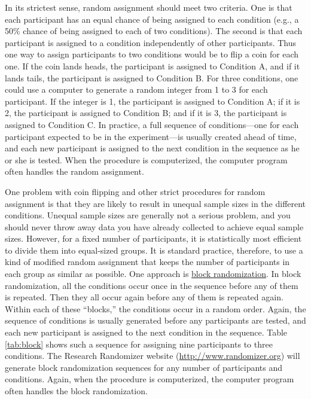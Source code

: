 \documentclass[
]{krantz}
\begin{document}
In its strictest sense, random assignment should meet two criteria. One is that each participant has an equal chance of being assigned to each condition (e.g., a 50\% chance of being assigned to each of two conditions). The second is that each participant is assigned to a condition independently of other participants. Thus one way to assign participants to two conditions would be to flip a coin for each one. If the coin lands heads, the participant is assigned to Condition A, and if it lands tails, the participant is assigned to Condition B. For three conditions, one could use a computer to generate a random integer from 1 to 3 for each participant. If the integer is 1, the participant is assigned to Condition A; if it is 2, the participant is assigned to Condition B; and if it is 3, the participant is assigned to Condition C. In practice, a full sequence of conditions---one for each participant expected to be in the experiment---is usually created ahead of time, and each new participant is assigned to the next condition in the sequence as he or she is tested. When the procedure is computerized, the computer program often handles the random assignment.

One problem with coin flipping and other strict procedures for random assignment is that they are likely to result in unequal sample sizes in the different conditions. Unequal sample sizes are generally not a serious problem, and you should never throw away data you have already collected to achieve equal sample sizes. However, for a fixed number of participants, it is statistically most efficient to divide them into equal-sized groups. It is standard practice, therefore, to use a kind of modified random assignment that keeps the number of participants in each group as similar as possible. One approach is \hyperref[block-randomization]{block randomization}. In block randomization, all the conditions occur once in the sequence before any of them is repeated. Then they all occur again before any of them is repeated again. Within each of these ``blocks,'' the conditions occur in a random order. Again, the sequence of conditions is usually generated before any participants are tested, and each new participant is assigned to the next condition in the sequence. Table \ref{tab:block} shows such a sequence for assigning nine participants to three conditions. The Research Randomizer website (\url{http://www.randomizer.org}) will generate block randomization sequences for any number of participants and conditions. Again, when the procedure is computerized, the computer program often handles the block randomization.
\end{document}
